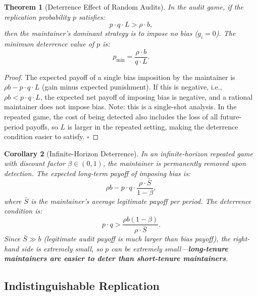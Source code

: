 \documentclass[11pt,a4paper]{article}
\newtheorem{theorem}{Theorem}[section]
\newtheorem{corollary}[theorem]{Corollary}
\theoremstyle{definition}
\begin{document}
\begin{theorem}[Deterrence Effect of Random Audits]
\label{thm:deterrence}
In the audit game, if the replication probability $p$ satisfies:
\begin{equation}\label{eq:deterrence_condition}
    p \cdot q \cdot L > \rho \cdot b,
\end{equation}
then the maintainer's dominant strategy is to impose no bias ($g_i = 0$). The minimum deterrence value of $p$ is:
\begin{equation}\label{eq:min_p}
    p_{\min} = \frac{\rho \cdot b}{q \cdot L}.
\end{equation}
\end{theorem}

\begin{proof}
The expected payoff of a single bias imposition by the maintainer is $\rho b - p \cdot q \cdot L$ (gain minus expected punishment). If this is negative, i.e., $\rho b < p \cdot q \cdot L$, the expected net payoff of imposing bias is negative, and a rational maintainer does not impose bias. Note: this is a single-shot analysis. In the repeated game, the cost of being detected also includes the loss of all future-period payoffs, so $L$ is larger in the repeated setting, making the deterrence condition easier to satisfy. \hfill$\square$
\end{proof}

\begin{corollary}[Infinite-Horizon Deterrence]
\label{cor:infinite_deterrence}
In an infinite-horizon repeated game with discount factor $\beta \in (0, 1)$, the maintainer is permanently removed upon detection. The expected long-term payoff of imposing bias is:
\begin{equation*}
    \rho b - p \cdot q \cdot \frac{\rho \cdot \bar{S}}{1 - \beta},
\end{equation*}
where $\bar{S}$ is the maintainer's average legitimate payoff per period. The deterrence condition is:
\begin{equation}\label{eq:infinite_deterrence}
    p \cdot q > \frac{\rho b (1-\beta)}{\rho \cdot \bar{S}}.
\end{equation}
Since $\bar{S} \gg b$ (legitimate audit payoff is much larger than bias payoff), the right-hand side is extremely small, so $p$ can be extremely small---\textbf{long-tenure maintainers are easier to deter than short-tenure maintainers}.
\end{corollary}

\subsection{Indistinguishable Replication}
\end{document}
